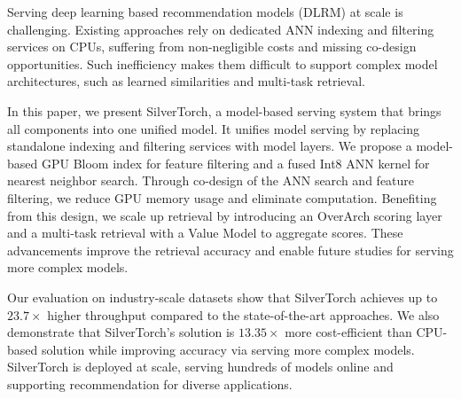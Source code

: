 Serving deep learning based recommendation models (DLRM) at scale is challenging. Existing approaches rely on dedicated ANN indexing and filtering services on CPUs, suffering from non-negligible costs and missing co-design opportunities. Such inefficiency makes them difficult to support complex model architectures, such as learned similarities and multi-task retrieval.

In this paper, we present SilverTorch, a model-based serving system that brings all components into one unified model. It unifies model serving by replacing standalone indexing and filtering services with model layers. We propose a model-based GPU Bloom index for feature filtering and a fused Int8 ANN kernel for nearest neighbor search. Through co-design of the ANN search and feature filtering, we reduce GPU memory usage and eliminate computation. Benefiting from this design, we scale up retrieval by introducing an OverArch scoring layer and a multi-task retrieval with a Value Model to aggregate scores. These advancements improve the retrieval accuracy and enable future studies for serving more complex models.

Our evaluation on industry-scale datasets show that SilverTorch achieves up to $23.7\times$ higher throughput compared to the state-of-the-art approaches. We also demonstrate that SilverTorch’s solution is $13.35\times$ more cost-efficient than CPU-based solution while improving accuracy via serving more complex models. SilverTorch is deployed at scale, serving hundreds of models online and supporting recommendation for diverse applications.